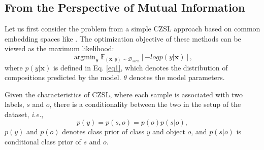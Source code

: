 \documentclass[letterpaper]{article} %
\newcommand{\mx}{\mathbf{x}}
\newcommand{\ie}{\textit{i.e.}}
\theoremstyle{definition}
\begin{document}
\subsection{From the Perspective of Mutual Information} \label{subsec_mutal}
Let us first consider the problem from a simple CZSL approach based on common embedding spaces like \cite{mancini2021open,naeem2021learning}. The optimization objective of these methods can be viewed as the maximum likelihood:
	\begin{equation}
		\operatorname{argmin}_{\theta}\mathbb{E}_{(\mx,y)\sim \mathcal{D}_{seen}}[-logp(y|\mx)],
        \label{eq_objective}
	\end{equation}
where $p(y|\mx)$ is defined in Eq. \ref{eq1}, which denotes the distribution of compositions predicted by the model. $\theta$ denotes the model parameters.

Given the characteristics of CZSL, where each sample is associated with two labels, $s$ and $o$, there is a conditionality between the two in the setup of the dataset, \ie,
	\begin{equation}
		p(y)=p(s,o)=p(o)p(s|o),
        \label{eq_condition}
	\end{equation}
$p(y)$ and $p(o)$ denotes class prior of class $y$ and object $o$, and $p(s|o)$ is conditional class prior of $s$ and $o$.
\end{document}
